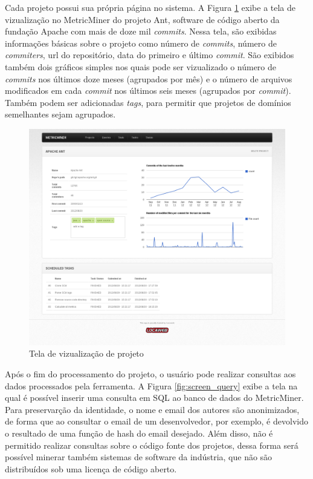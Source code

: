 \documentclass[a4paper, 12pt, twoside]{book}
\begin{document}
        Cada projeto possui sua própria página no sistema. A Figura \ref{fig:screen_projeto} exibe a 
        tela de vizualização no MetricMiner do projeto Ant, software de código aberto da fundação     
        Apache com mais de doze mil \textit{commits}. Nessa tela, são exibidas informações básicas 
        sobre o projeto como número de \textit{commits}, número de \textit{commiters}, url do 
        repositório, data do primeiro e último \textit{commit}. São exibidos também dois gráficos 
        simples nos quais pode ser vizualizado o número de \textit{commits} nos últimos doze meses 
        (agrupados por mês) e o número de arquivos modificados em cada \textit{commit} nos últimos 
        seis meses (agrupados por \textit{commit}). Também podem ser adicionadas \textit{tags},
        para permitir que projetos de domínios semelhantes sejam agrupados.
    
        \begin{figure}[ht]
            \centering
            \includegraphics[width=1.00\textwidth]{img/ant.png}
            \caption{Tela de vizualização de projeto}
            \label{fig:screen_projeto}
        \end{figure}

        Após o fim do processamento do projeto, o usuário pode realizar consultas aos dados processados pela ferramenta. A Figura \ref{fig:screen_query} exibe a tela na qual é possível inserir uma consulta em SQL ao banco de dados do MetricMiner. Para preservarção da identidade, o nome e email dos autores são anonimizados, de forma que ao consultar o email de um desenvolvedor, por exemplo, é devolvido o resultado de uma função de hash do email desejado. Além disso, não é permitido realizar consultas sobre o código fonte dos projetos, dessa forma será possível minerar também sistemas de software da indústria, que não são distribuídos sob uma licença de código aberto.
\end{document}
